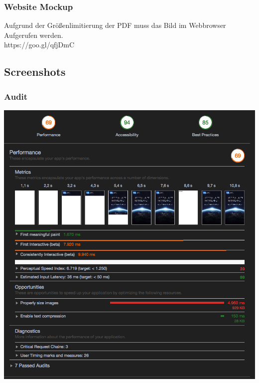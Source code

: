 \documentclass[11pt,a4paper]{article}
\begin{document}
\begin{appendices}
\subsubsection{Website Mockup}
\centering
Aufgrund der Größenlimitierung der PDF muss das Bild im Webbrowser Aufgerufen werden.\\
https://goo.gl/qfjDmC
\flushleft


\subsection{Screenshots}
\subsubsection{Audit}
\label{sec:audit}
\includegraphics[scale=0.5]{audit}

\end{appendices}
\end{document}
